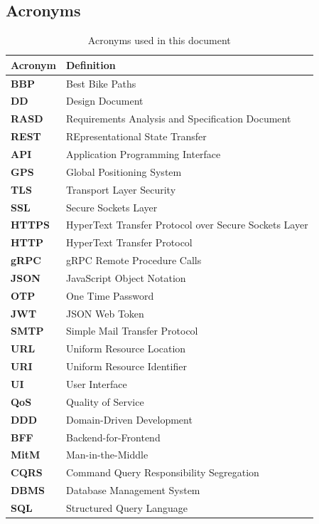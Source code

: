 \subsection{Acronyms}
\begin{table}[H]
    \sf
    \small
    \centering
    \renewcommand{\arraystretch}{1.5}
    \begin{tabularx}{\textwidth}{|l|X|}
        \hline
        \rowcolor{lightgray} \textbf{Acronym} & \textbf{Definition}\\
        \hline
        \textbf{BBP} & Best Bike Paths \\
        \textbf{DD} & Design Document \\
        \textbf{RASD} & Requirements Analysis and Specification Document \\
        \textbf{REST} & REpresentational State Transfer \\
        \textbf{API} & Application Programming Interface \\
        \textbf{GPS} & Global Positioning System \\
        \textbf{TLS} & Transport Layer Security \\
        \textbf{SSL} & Secure Sockets Layer \\
        \textbf{HTTPS} & HyperText Transfer Protocol over Secure Sockets Layer \\
        \textbf{HTTP} & HyperText Transfer Protocol \\
        \textbf{gRPC} & gRPC Remote Procedure Calls \\
        \textbf{JSON} & JavaScript Object Notation \\
        \textbf{OTP} & One Time Password \\
        \textbf{JWT} & JSON Web Token \\
        \textbf{SMTP} & Simple Mail Transfer Protocol \\
        \textbf{URL} & Uniform Resource Location \\
        \textbf{URI} & Uniform Resource Identifier \\
        \textbf{UI} & User Interface \\
        \textbf{QoS} & Quality of Service \\
        \textbf{DDD} & Domain-Driven Development \\
        \textbf{BFF} & Backend-for-Frontend \\
        \textbf{MitM} & Man-in-the-Middle \\
        \textbf{CQRS} & Command Query Responsibility Segregation \\
        \textbf{DBMS} & Database Management System \\
        \textbf{SQL} & Structured Query Language \\
        \hline
    \end{tabularx}
    \caption{Acronyms used in this document}
\end{table}

